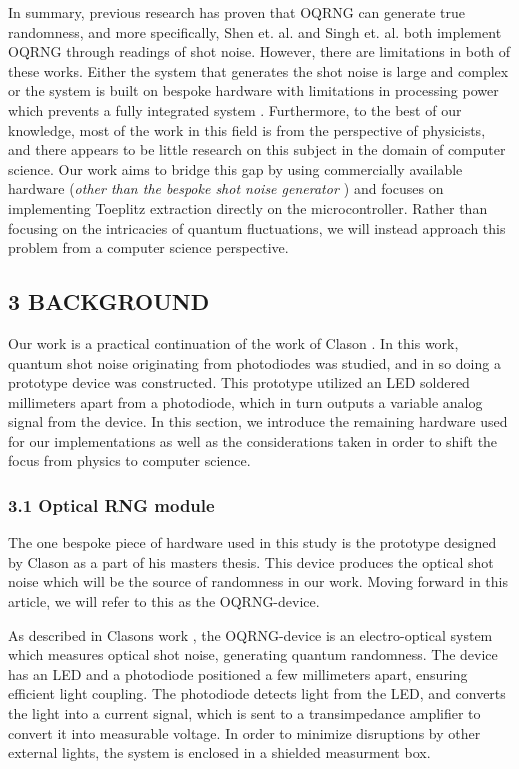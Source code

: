 In summary, previous research has proven that OQRNG can generate true randomness, and more specifically, Shen et. al. \cite{contender1} and Singh et. al. \cite{singh} both implement OQRNG through readings of shot noise. However, there are limitations in both of these works. Either the system that generates the shot noise is large and complex \cite{contender1} or the system is built on bespoke hardware with limitations in processing power which prevents a fully integrated system \cite{singh}. Furthermore, to the best of our knowledge, most of the work in this field is from the perspective of physicists, and there appears to be little research on this subject in the domain of computer science. Our work aims to bridge this gap by using commercially available hardware (\emph{other than the bespoke shot noise generator \cite{Clason2023}}) and focuses on implementing Toeplitz extraction directly on the microcontroller. Rather than focusing on the intricacies of quantum fluctuations, we will instead approach this problem from a computer science perspective.

\subsection{3 BACKGROUND}\label{background}

Our work is a practical continuation of the work of Clason \cite{Clason2023}. In this work, quantum shot noise originating from photodiodes was studied, and in so doing a prototype device was constructed. This prototype utilized an LED soldered millimeters apart from a photodiode, which in turn outputs a variable analog signal from the device. In this section, we introduce the remaining hardware used for our implementations as well as the considerations taken in order to shift the focus from physics to computer science.

\subsubsection{3.1 Optical RNG module}\label{optical-rng-module}

The one bespoke piece of hardware used in this study is the prototype designed by Clason \cite{Clason2023} as a part of his masters thesis. This device produces the optical shot noise which will be the source of randomness in our work. Moving forward in this article, we will refer to this as the OQRNG-device.

As described in Clasons work \cite{Clason2023}, the OQRNG-device is an electro-optical system which measures optical shot noise, generating quantum randomness. The device has an LED and a photodiode positioned a few millimeters apart, ensuring efficient light coupling. The photodiode detects light from the LED, and converts the light into a current signal, which is sent to a transimpedance amplifier to convert it into measurable voltage. In order to minimize disruptions by other external lights, the system is enclosed in a shielded measurment box.

